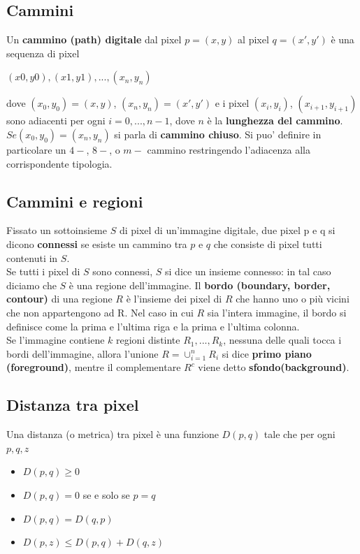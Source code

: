 \subsection{Cammini}

Un \textbf{cammino (path) digitale} dal pixel $p = (x,y)$ al pixel $q = (x',
    y')$ è una sequenza di pixel

\begin{center}
    $(x0, y0), (x1, y1), ... ,(x_n, y_n)$
\end{center}

dove $(x_0, y_0) = (x,y)$, $(x_n, y_n) = (x', y')$ e i pixel $(x_i, y_i)$,
$(x_{i+1}, y_{i+1})$ sono adiacenti per ogni $i=0, ... , n-1$, dove $n$ è la
\textbf{lunghezza del cammino}. $Se (x_0, y_0) = (x_n, y_n)$ si parla di
\textbf{cammino chiuso}. Si puo' definire in particolare un $4-$, $8-$, o
$m-$ cammino restringendo l'adiacenza alla corrispondente tipologia.

\subsection{Cammini e regioni}

Fissato un sottoinsieme $S$ di pixel di un'immagine digitale, due pixel p e q si
dicono \textbf{connessi} se esiste un cammino tra $p$ e $q$ che consiste di
pixel tutti contenuti in $S$. \\Se tutti i pixel di $S$ sono connessi, $S$ si
dice un insieme connesso: in tal caso diciamo che $S$ è una regione
dell'immagine. Il \textbf{bordo (boundary, border, contour)} di una regione $R$
è l'insieme dei pixel di $R$ che hanno uno o più vicini che non appartengono ad
R. Nel caso in cui $R$ sia l'intera immagine, il bordo si definisce come la
prima e l'ultima riga e la prima e l'ultima colonna. \\Se l'immagine contiene
$k$ regioni distinte $R_1,..., R_k$, nessuna delle quali tocca i bordi
dell'immagine, allora l'unione $R = \cup_{i=1}^n R_i$ si dice \textbf{primo
    piano (foreground)}, mentre il complementare $R^c$ viene detto
\textbf{sfondo(background)}.

\subsection{Distanza tra pixel}

Una distanza (o metrica) tra pixel è una funzione $D(p, q)$ tale che per ogni
$p, q, z$

\begin{itemize}
    \item $D(p, q) \ge 0$
    \item $D(p, q) = 0$ se e solo se $p = q$
    \item $D(p, q) = D(q, p)$
    \item $D(p, z) \le D(p, q) + D(q, z)$
\end{itemize}

